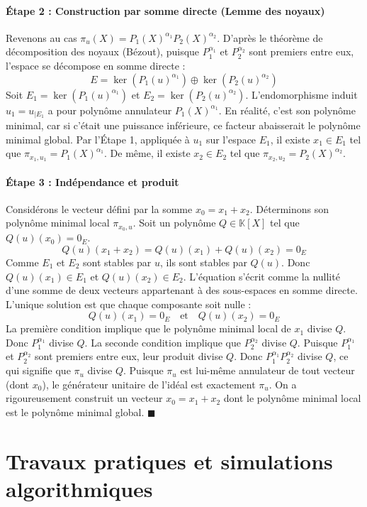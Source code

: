 \documentclass[11pt,a4paper]{article}
\begin{document}
\subsection{Étape 2 : Construction par somme directe (Lemme des noyaux)}
Revenons au cas $\pi_u(X) = P_1(X)^{\alpha_1} P_2(X)^{\alpha_2}$.
D'après le théorème de décomposition des noyaux (Bézout), puisque $P_1^{\alpha_1}$ et $P_2^{\alpha_2}$ sont premiers entre eux, l'espace se décompose en somme directe :
$$E = \ker(P_1(u)^{\alpha_1}) \oplus \ker(P_2(u)^{\alpha_2})$$
Soit $E_1 = \ker(P_1(u)^{\alpha_1})$ et $E_2 = \ker(P_2(u)^{\alpha_2})$.
L'endomorphisme induit $u_1 = u_{|E_1}$ a pour polynôme annulateur $P_1(X)^{\alpha_1}$. En réalité, c'est son polynôme minimal, car si c'était une puissance inférieure, ce facteur abaisserait le polynôme minimal global.
Par l'Étape 1, appliquée à $u_1$ sur l'espace $E_1$, il existe $x_1 \in E_1$ tel que $\pi_{x_1, u_1} = P_1(X)^{\alpha_1}$.
De même, il existe $x_2 \in E_2$ tel que $\pi_{x_2, u_2} = P_2(X)^{\alpha_2}$.

\subsection{Étape 3 : Indépendance et produit}
Considérons le vecteur défini par la somme $x_0 = x_1 + x_2$.
Déterminons son polynôme minimal local $\pi_{x_0, u}$.
Soit un polynôme $Q \in \mathbb{K}[X]$ tel que $Q(u)(x_0) = 0_E$.
$$Q(u)(x_1 + x_2) = Q(u)(x_1) + Q(u)(x_2) = 0_E$$
Comme $E_1$ et $E_2$ sont stables par $u$, ils sont stables par $Q(u)$. Donc $Q(u)(x_1) \in E_1$ et $Q(u)(x_2) \in E_2$.
L'équation s'écrit comme la nullité d'une somme de deux vecteurs appartenant à des sous-espaces en somme directe. L'unique solution est que chaque composante soit nulle :
$$Q(u)(x_1) = 0_E \quad \text{et} \quad Q(u)(x_2) = 0_E$$
La première condition implique que le polynôme minimal local de $x_1$ divise $Q$. Donc $P_1^{\alpha_1}$ divise $Q$.
La seconde condition implique que $P_2^{\alpha_2}$ divise $Q$.
Puisque $P_1^{\alpha_1}$ et $P_2^{\alpha_2}$ sont premiers entre eux, leur produit divise $Q$.
Donc $P_1^{\alpha_1} P_2^{\alpha_2}$ divise $Q$, ce qui signifie que $\pi_u$ divise $Q$.
Puisque $\pi_u$ est lui-même annulateur de tout vecteur (dont $x_0$), le générateur unitaire de l'idéal est exactement $\pi_u$.
On a rigoureusement construit un vecteur $x_0 = x_1 + x_2$ dont le polynôme minimal local est le polynôme minimal global. $\blacksquare$



\part{Travaux pratiques et simulations algorithmiques}
\end{document}
